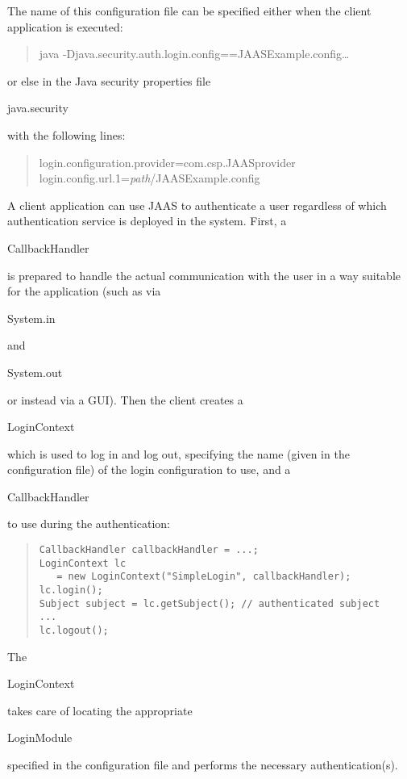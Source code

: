 \noindent
The name of this configuration file can be specified either when the
client application is executed:
\begin{quote}\begin{code}
java -Djava.security.auth.login.config==JAASExample.config\dots
\end{code}\end{quote}
or else in the Java security properties file \begin{code}java.security\end{code}
with the following lines:
\begin{quote}\begin{code}
login.configuration.provider=com.csp.JAASprovider \\
login.config.url.1=\emph{path}/JAASExample.config
\end{code}\end{quote}

A client application can use JAAS to authenticate a user regardless of which
authentication service is deployed in the system. First, a
\begin{code}CallbackHandler\end{code} is prepared to handle the
actual communication with the user in a way suitable for the application
(such as via \begin{code}System.in\end{code} and \begin{code}System.out\end{code}
or instead via a GUI). Then the client creates a \begin{code}LoginContext\end{code}
which is used to log in and log out,
specifying the name (given in the configuration file) of the login
configuration to use, and a \begin{code}CallbackHandler\end{code} to use during
the authentication:
\begin{quote}\begin{code}\begin{verbatim}
CallbackHandler callbackHandler = ...;
LoginContext lc
   = new LoginContext("SimpleLogin", callbackHandler);
lc.login();
Subject subject = lc.getSubject(); // authenticated subject
...
lc.logout();
\end{verbatim}\end{code}\end{quote}
The \begin{code}LoginContext\end{code} takes care of locating the appropriate
\begin{code}LoginModule\end{code} specified in the configuration file and
performs the necessary authentication(s).

